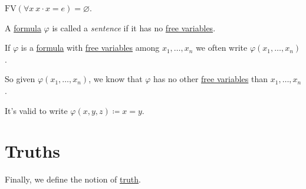 \begin{eg}
	\(\mathrm{FV} (\forall x\ x\cdot x = e) = \varnothing \).
\end{eg}

\begin{definition}[Sentence]\label{def:sentence}
	A \hyperref[def:formula]{formula} \(\varphi \) is called a \emph{sentence} if it has no \hyperref[def:free-variable]{free variables}.
\end{definition}

\begin{notation}
	If \(\varphi \) is a \hyperref[def:formula]{formula} with \hyperref[def:free-variable]{free variables} among \(x_1, \ldots , x_n\) we often write \(\varphi (x_1, \ldots , x_n)\).
\end{notation}

\begin{remark}
	So given \(\varphi (x_1, \ldots , x_n)\), we know that \(\varphi \) has no other \hyperref[def:free-variable]{free variables} than \(x_1, \ldots , x_n\).
\end{remark}

\begin{eg}
	It's valid to write \(\varphi (x, y, z) \coloneqq x=y\).
\end{eg}

\section{Truths}
Finally, we define the notion of \hyperref[def:truth]{truth}.

